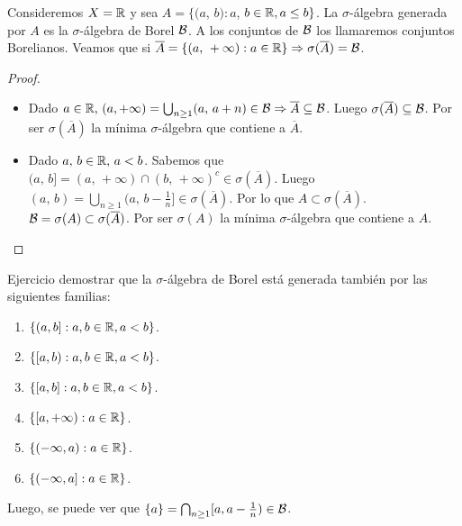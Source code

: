 \begin{eg}
    Consideremos \(X = \mathbb{R}\) y sea \(A = \{ (a\), \(b) : a\), \(b \in \mathbb{R}, a \leq b \}\). La \(\sigma\)-álgebra generada por \(A\) es la \(\sigma\)-álgebra de Borel \(\mathcal{B}\).
    A los conjuntos de \(\mathcal{B}\) los llamaremos conjuntos Borelianos. Veamos que si \(\overline{A} = \{ (a\text{, } +\infty) : a \in \mathbb{R} \} \Rightarrow \sigma(\overline{A}) = \mathcal{B}\).
    \begin{proof}
        \begin{itemize}
            \item Dado \(a \in \mathbb{R}\text{, } (a, +\infty) = \bigcup_{n \geq 1} (a\text{, } a+n) \in \mathcal{B} \Rightarrow \overline{A} \subseteq \mathcal{B}\).
                  Luego \(\sigma(\overline{A}) \subseteq \mathcal{B}\). Por ser \(\sigma(\overline{A})\) la mínima \(\sigma\)-álgebra que contiene a \(\overline{A}\).
            \item Dado \(a\text{, } b \in \mathbb{R} \text{, } a < b\). Sabemos que \((a\text{, } b] = (a\text{, } +\infty) \cap (b\text{, } +\infty)^c \in \sigma(\overline{A})\).
                  Luego \((a\text{, } b) = \bigcup_{n \geq 1} (a\text{, } b - \frac{1}{n}] \in \sigma(\overline{A})\). Por lo que \(A \subset \sigma(\overline{A})\).
                  \(\mathcal{B} = \sigma(A) \subset \sigma(\overline{A})\). Por ser \(\sigma(A)\) la mínima \(\sigma\)-álgebra que contiene a \(A\).
        \end{itemize}
    \end{proof}
\end{eg}

Ejercicio demostrar que la \(\sigma\)-álgebra de Borel está generada también por las siguientes familias:

\begin{enumerate}
    \item \(\{ (a, b] : a, b \in \mathbb{R}, a < b \}\).
    \item \(\{ [a, b) : a, b \in \mathbb{R}, a < b \}\).
    \item \(\{ [a, b] : a, b \in \mathbb{R}, a < b \}\).
    \item \(\{ [a, +\infty) : a \in \mathbb{R} \}\).
    \item \(\{ (-\infty, a) : a \in \mathbb{R} \}\).
    \item \(\{ (-\infty, a] : a \in \mathbb{R} \}\).
\end{enumerate}

Luego, se puede ver que \(\{ a \} = \bigcap_{n \geq 1} [a, a - \frac{1}{n}) \in \mathcal{B}\).
